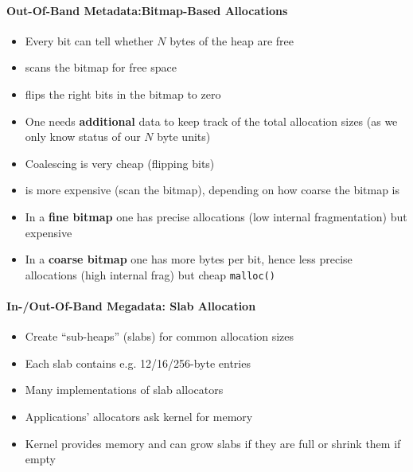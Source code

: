 \paragraph[Bitmap-Based Allocations]{Out-Of-Band Metadata:\newline Bitmap-Based Allocations}
\begin{itemize}
    \item Every bit can tell whether $N$ bytes of the heap are free
    \item {} scans the bitmap for free space %
    \item {} flips the right bits in the bitmap to zero %
    \item One needs \textbf{additional} data to keep track of the total allocation sizes (as we only know status of our $N$ byte units)
\end{itemize}


\begin{itemize}
    \item Coalescing is very cheap (flipping bits)
    \item {} is more expensive (scan the bitmap), depending on how coarse the bitmap is %
    \item In a \textbf{fine bitmap} one has precise allocations (low internal fragmentation) but expensive  %
    \item In a \textbf{coarse bitmap} one has more bytes per bit, hence less precise allocations (high internal frag) but cheap \lstinline{malloc()}
\end{itemize}


\paragraph{In-/Out-Of-Band Megadata: Slab Allocation}

\begin{itemize}
    \item Create ``sub-heaps'' (slabs) for common allocation sizes
    \item Each slab contains e.g. 12/16/256-byte entries
    \item Many implementations of slab allocators
    \item Applications'  allocators ask kernel for memory
    \item Kernel provides memory and can grow slabs if they are full or shrink them if empty
\end{itemize}

